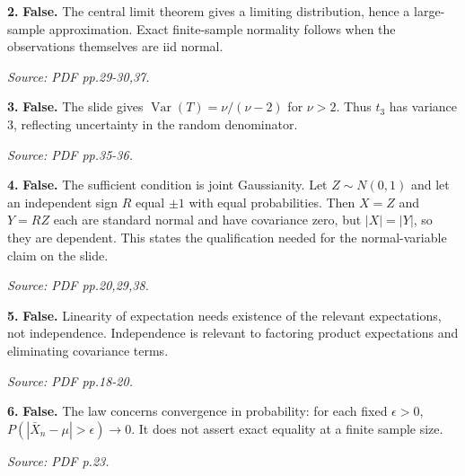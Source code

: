 \documentclass[11pt,a4paper]{article}
\begin{document}
\par\noindent\begin{minipage}{\linewidth}
\textbf{2.} \textbf{False.} The central limit theorem gives a limiting distribution, hence a large-sample approximation. Exact finite-sample normality follows when the observations themselves are iid normal.

{\footnotesize\textit{Source: PDF pp.29-30,37.}}
\end{minipage}\par\vspace{3mm}
\par\noindent\begin{minipage}{\linewidth}
\textbf{3.} \textbf{False.} The slide gives \(\operatorname{Var}(T)=\nu/(\nu-2)\) for \(\nu>2\). Thus \(t_3\) has variance \(3\), reflecting uncertainty in the random denominator.

{\footnotesize\textit{Source: PDF pp.35-36.}}
\end{minipage}\par\vspace{3mm}
\par\noindent\begin{minipage}{\linewidth}
\textbf{4.} \textbf{False.} The sufficient condition is joint Gaussianity. Let \(Z\sim N(0,1)\) and let an independent sign \(R\) equal \(\pm1\) with equal probabilities. Then \(X=Z\) and \(Y=RZ\) each are standard normal and have covariance zero, but \(|X|=|Y|\), so they are dependent. This states the qualification needed for the normal-variable claim on the slide.

{\footnotesize\textit{Source: PDF pp.20,29,38.}}
\end{minipage}\par\vspace{3mm}
\par\noindent\begin{minipage}{\linewidth}
\textbf{5.} \textbf{False.} Linearity of expectation needs existence of the relevant expectations, not independence. Independence is relevant to factoring product expectations and eliminating covariance terms.

{\footnotesize\textit{Source: PDF pp.18-20.}}
\end{minipage}\par\vspace{3mm}
\par\noindent\begin{minipage}{\linewidth}
\textbf{6.} \textbf{False.} The law concerns convergence in probability: for each fixed \(\epsilon>0\), \(P(|\bar X_n-\mu|>\epsilon)\to0\). It does not assert exact equality at a finite sample size.

{\footnotesize\textit{Source: PDF p.23.}}
\end{minipage}\par\vspace{3mm}
\end{document}

